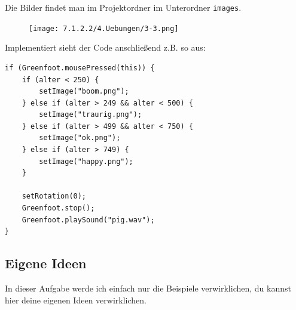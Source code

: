 \documentclass{scrartcl}   %
\begin{document}
\newpage

Die Bilder findet man im Projektordner im Unterordner \texttt{images}.\\

\begin{figure}[ht]
	\centering
	\texttt{[image: 7.1.2.2/4.Uebungen/3-3.png]}
\end{figure}

Implementiert sieht der Code anschließend z.B. so aus:

\begin{lstlisting}
if (Greenfoot.mousePressed(this)) {
    if (alter < 250) {
        setImage("boom.png");
    } else if (alter > 249 && alter < 500) {
        setImage("traurig.png");
    } else if (alter > 499 && alter < 750) {
        setImage("ok.png");
    } else if (alter > 749) {
        setImage("happy.png");
    }
    
    setRotation(0);
    Greenfoot.stop();
    Greenfoot.playSound("pig.wav");
}
\end{lstlisting}

\newpage

\subsection{Eigene Ideen}

In dieser Aufgabe werde ich einfach nur die Beispiele verwirklichen, du kannst hier deine eigenen Ideen verwirklichen.
\end{document}
